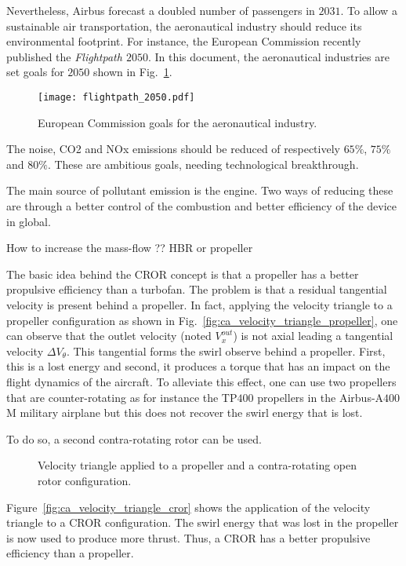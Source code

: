 Nevertheless, Airbus forecast a doubled number of passengers in
$2031$. To allow a sustainable air transportation, the aeronautical
industry should reduce its environmental footprint. For instance,
the European Commission recently published the \emph{Flightpath $2050$}.
In this document, the aeronautical industries are set goals for $2050$
shown in Fig.~\ref{fig:flightpath_2050}.
\begin{figure}[htbp]
  \centering
  \texttt{[image: flightpath\_2050.pdf]}
  \caption{European Commission goals for the aeronautical industry. }
  \label{fig:flightpath_2050}
\end{figure}
The noise, CO2 and NOx emissions should be reduced of 
respectively $65\%$, $75\%$ and $80\%$.
These are ambitious goals, needing technological breakthrough.

The main source of pollutant emission is the engine. Two ways of reducing
these are through a better control of the combustion and better
efficiency of the device in global.

How to increase the mass-flow ??
HBR or propeller

The basic idea behind the CROR concept is that a propeller has a 
better propulsive efficiency than a turbofan. The problem is that
a residual tangential velocity is present behind a propeller.
In fact, applying the velocity triangle to a propeller configuration
as shown in Fig.~\ref{fig:ca_velocity_triangle_propeller}, one can
observe that the outlet velocity (noted $V^{out}_x$) is not axial
leading a tangential velocity $\Delta V_{\theta}$. This tangential forms
the swirl observe behind a propeller. First, this is a lost energy and
second, it produces a torque that has an impact on the flight dynamics
of the aircraft. To alleviate this effect, one can use two propellers
that are counter-rotating as for instance the TP$400$ propellers
in the Airbus-A$400$M military airplane but this does not recover
the swirl energy that is lost.

To do so, a second contra-rotating rotor can be used.
\begin{figure}[htb]
  \centering
  \caption{Velocity triangle applied to a propeller and a 
  contra-rotating open rotor configuration.}
\end{figure}
Figure~\ref{fig:ca_velocity_triangle_cror} shows the application
of the velocity triangle to a CROR configuration. The swirl
energy that was lost in the propeller is now used to 
produce more thrust. Thus, a CROR has a better propulsive
efficiency than a propeller.

